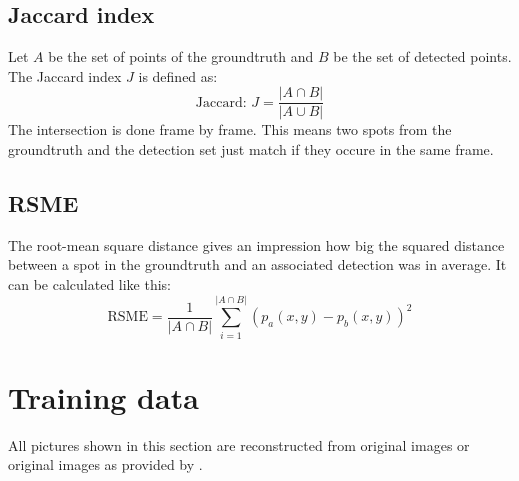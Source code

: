 \subsection{Jaccard index}
Let $A$ be the set of points of the groundtruth and $B$ be the set of detected points. The Jaccard index $J$ is defined as:
\begin{equation}
\text{Jaccard: }J = \frac{\left|A\cap B\right|}{\left|A\cup B\right|}
\end{equation}
The intersection is done frame by frame. This means two spots from the groundtruth and the detection set just match if they occure in the same frame. 
\subsection{RSME}
The root-mean square distance gives an impression how big the squared distance between a spot in the groundtruth and an associated detection was in average. It can be calculated like this:
\begin{equation}
\text{RSME} = \frac{1}{\left|A\cap B\right|}\sum\limits_{i=1}^{\left|A\cap B\right|} \left(p_a(x,y)-p_b(x,y)\right)^2
\end{equation}
\section{Training data}
All pictures shown in this section are reconstructed from original images or original images as provided by \cite{challenge}.
